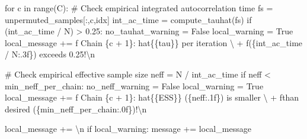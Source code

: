 \documentclass[
  letterpaper,
  DIV=11,
  numbers=noendperiod]{scrartcl}
\newenvironment{Shaded}{\begin{snugshade}}{\end{snugshade}}
\newcommand{\BuiltInTok}[1]{\textcolor[rgb]{0.00,0.23,0.31}{#1}}
\newcommand{\CharTok}[1]{\textcolor[rgb]{0.13,0.47,0.30}{#1}}
\newcommand{\CommentTok}[1]{\textcolor[rgb]{0.37,0.37,0.37}{#1}}
\newcommand{\ControlFlowTok}[1]{\textcolor[rgb]{0.00,0.23,0.31}{#1}}
\newcommand{\DecValTok}[1]{\textcolor[rgb]{0.68,0.00,0.00}{#1}}
\newcommand{\FloatTok}[1]{\textcolor[rgb]{0.68,0.00,0.00}{#1}}
\newcommand{\KeywordTok}[1]{\textcolor[rgb]{0.00,0.23,0.31}{#1}}
\newcommand{\NormalTok}[1]{\textcolor[rgb]{0.00,0.23,0.31}{#1}}
\newcommand{\OperatorTok}[1]{\textcolor[rgb]{0.37,0.37,0.37}{#1}}
\newcommand{\SpecialCharTok}[1]{\textcolor[rgb]{0.37,0.37,0.37}{#1}}
\newcommand{\SpecialStringTok}[1]{\textcolor[rgb]{0.13,0.47,0.30}{#1}}
\newcommand{\StringTok}[1]{\textcolor[rgb]{0.13,0.47,0.30}{#1}}
\newcommand{\VariableTok}[1]{\textcolor[rgb]{0.07,0.07,0.07}{#1}}
\begin{document}
\begin{Shaded}
\begin{Highlighting}[]
    \ControlFlowTok{for}\NormalTok{ c }\KeywordTok{in} \BuiltInTok{range}\NormalTok{(C):}
      \CommentTok{\# Check empirical integrated autocorrelation time}
\NormalTok{      fs }\OperatorTok{=}\NormalTok{ unpermuted\_samples[:,c,idx]}
\NormalTok{      int\_ac\_time }\OperatorTok{=}\NormalTok{ compute\_tauhat(fs)}
      \ControlFlowTok{if}\NormalTok{ (int\_ac\_time }\OperatorTok{/}\NormalTok{ N) }\OperatorTok{\textgreater{}} \FloatTok{0.25}\NormalTok{:}
\NormalTok{        no\_tauhat\_warning }\OperatorTok{=} \VariableTok{False}
\NormalTok{        local\_warning }\OperatorTok{=} \VariableTok{True}
\NormalTok{        local\_message }\OperatorTok{+=}  \SpecialStringTok{f\textquotesingle{}  Chain }\SpecialCharTok{\{}\NormalTok{c }\OperatorTok{+} \DecValTok{1}\SpecialCharTok{\}}\SpecialStringTok{: hat}\CharTok{\{\{}\SpecialStringTok{tau}\CharTok{\}\}}\SpecialStringTok{ per iteration \textquotesingle{}}\NormalTok{ \textbackslash{}}
                        \OperatorTok{+} \SpecialStringTok{f\textquotesingle{}(}\SpecialCharTok{\{}\NormalTok{int\_ac\_time }\OperatorTok{/}\NormalTok{ N}\SpecialCharTok{:.3f\}}\SpecialStringTok{) exceeds 0.25!}\CharTok{\textbackslash{}n}\SpecialStringTok{\textquotesingle{}}
      
      \CommentTok{\# Check empirical effective sample size}
\NormalTok{      neff }\OperatorTok{=}\NormalTok{ N }\OperatorTok{/}\NormalTok{ int\_ac\_time}
      \ControlFlowTok{if}\NormalTok{ neff }\OperatorTok{\textless{}}\NormalTok{ min\_neff\_per\_chain:}
\NormalTok{        no\_neff\_warning }\OperatorTok{=} \VariableTok{False}
\NormalTok{        local\_warning }\OperatorTok{=} \VariableTok{True}
\NormalTok{        local\_message }\OperatorTok{+=}  \SpecialStringTok{f\textquotesingle{}  Chain }\SpecialCharTok{\{}\NormalTok{c }\OperatorTok{+} \DecValTok{1}\SpecialCharTok{\}}\SpecialStringTok{: hat}\CharTok{\{\{}\SpecialStringTok{ESS}\CharTok{\}\}}\SpecialStringTok{ (}\SpecialCharTok{\{}\NormalTok{neff}\SpecialCharTok{:.1f\}}\SpecialStringTok{) is smaller \textquotesingle{}}\NormalTok{ \textbackslash{}}
                        \OperatorTok{+} \SpecialStringTok{f\textquotesingle{}than desired (}\SpecialCharTok{\{}\NormalTok{min\_neff\_per\_chain}\SpecialCharTok{:.0f\}}\SpecialStringTok{)!}\CharTok{\textbackslash{}n}\SpecialStringTok{\textquotesingle{}}
    
\NormalTok{    local\_message }\OperatorTok{+=} \StringTok{\textquotesingle{}}\CharTok{\textbackslash{}n}\StringTok{\textquotesingle{}}
    \ControlFlowTok{if}\NormalTok{ local\_warning:}
\NormalTok{      message }\OperatorTok{+=}\NormalTok{ local\_message}
  

\end{Highlighting}
\end{Shaded}
\end{document}
